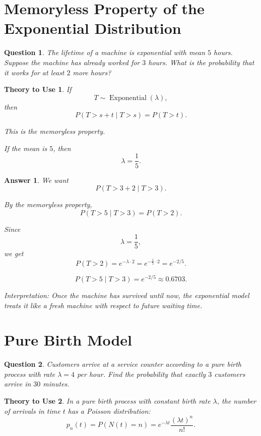 \documentclass[12pt]{article}
\newtheorem{question}{Question}
\newtheorem*{theory}{Theory to Use}
\newtheorem*{answer}{Answer}
\begin{document}
\section{Memoryless Property of the Exponential Distribution}

\begin{question}
The lifetime of a machine is exponential with mean \(5\) hours.
Suppose the machine has already worked for \(3\) hours.
What is the probability that it works for at least \(2\) more hours?
\end{question}

\begin{theory}
If
\[
T\sim \operatorname{Exponential}(\lambda),
\]
then
\[
P(T>s+t\mid T>s)=P(T>t).
\]

This is the memoryless property.

If the mean is \(5\), then
\[
\lambda=\frac{1}{5}.
\]
\end{theory}

\begin{answer}
We want
\[
P(T>3+2\mid T>3).
\]

By the memoryless property,
\[
P(T>5\mid T>3)=P(T>2).
\]

Since
\[
\lambda=\frac{1}{5},
\]
we get
\[
P(T>2)=e^{-\lambda\cdot 2}
=e^{-\frac{1}{5}\cdot 2}
=e^{-2/5}.
\]

\[
\boxed{P(T>5\mid T>3)=e^{-2/5}\approx 0.6703.}
\]

Interpretation: Once the machine has survived until now, the exponential model treats it like a fresh machine with respect to future waiting time.
\end{answer}

\section{Pure Birth Model}

\begin{question}
Customers arrive at a service counter according to a pure birth process with rate \(\lambda=4\) per hour.
Find the probability that exactly \(3\) customers arrive in \(30\) minutes.
\end{question}

\begin{theory}
In a pure birth process with constant birth rate \(\lambda\), the number of arrivals in time \(t\) has a Poisson distribution:
\[
p_n(t)=P(N(t)=n)=e^{-\lambda t}\frac{(\lambda t)^n}{n!}.
\]
\end{theory}
\end{document}
